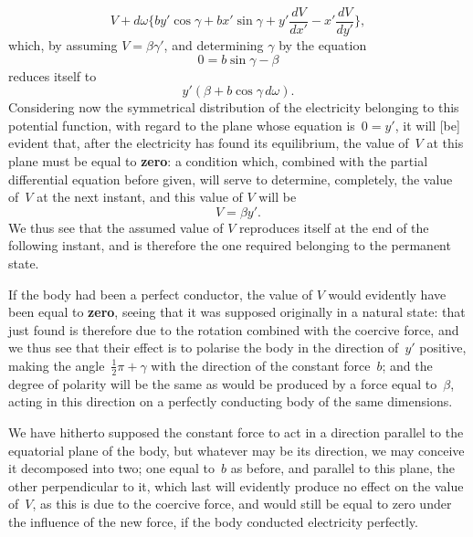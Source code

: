 \documentclass[12pt,notitlepage]{amsart}
\let\Emphasis\textbf
\begin{document}
\[
V+d\omega\biggl\{
  by'\cos\gamma+bx'\sin\gamma
  +y'\frac{dV}{dx'}-x'\frac{dV}{dy'}
\biggr\},
\]
which, by assuming $V=\beta\gamma'$, and determining $\gamma$ by the equation
\[
0=b\sin\gamma-\beta
\]
reduces itself to
\[
y'(\beta+b\cos\gamma\,d\omega).
\]
Considering now the symmetrical distribution of the electricity belonging to
this potential function, with regard to the plane whose equation is~${0=y'}$, it
will [be] evident that,
after the electricity has found its equilibrium, the value of~$V$
at this plane must be equal to \Emphasis{zero}:
a condition which, combined with the
partial differential equation before given, will serve to determine, completely,
the value of~$V$ at the next instant, and this value of $V$ will be
\[
V=\beta y'.
\]
We thus see that the assumed value of $V$ reproduces itself at the end of the
following instant, and is therefore the one required belonging to the permanent
state.

If the body had been a perfect conductor, the value of $V$ would
evidently have been equal to \Emphasis{zero},
seeing that it was supposed originally in
a natural state: that just found is therefore due to the rotation combined with
the coercive force, and we thus see that their effect is to polarise the body
in the direction of~$y'$ positive,
making the angle~${\frac12\pi+\gamma}$ with the direction
of the constant force~$b$; and the degree of polarity will be the same as would
be produced by a force equal to~$\beta$, acting in this direction on a perfectly
conducting body of the same dimensions.

We have hitherto supposed the constant force to act in a direction
parallel to the equatorial plane of the body, but whatever may be its direction,
we may conceive it decomposed into two; one equal to~$b$ as before, and
parallel to this plane, the other perpendicular to it, which last will evidently
produce no effect on the value of~$V$, as this is due to the coercive force,
and would still be equal to zero under the influence of the new force, if the
body conducted electricity perfectly.
\end{document}
